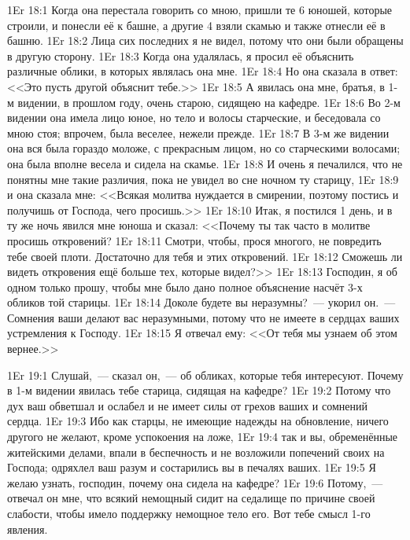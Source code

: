 \vs 1Er 18:1
Когда она перестала говорить со мною,
пришли те 6 юношей, которые строили,
и понесли её к башне,
а другие 4 взяли скамью и также отнесли её в башню.
\vs 1Er 18:2
Лица сих последних я не видел,
потому что они были обращены в другую сторону.
\vs 1Er 18:3
Когда она удалялась, я просил её объяснить различные облики,
в которых являлась она мне.
\vs 1Er 18:4
Но она сказала в ответ:
<<Это пусть другой объяснит тебе.>>
\vs 1Er 18:5
А явилась она мне, братья, в 1-м видении, в прошлом году,
очень старою, сидящею на кафедре.
\vs 1Er 18:6
Во 2-м видении она имела лицо юное,
но тело и волосы старческие, и беседовала со мною стоя;
впрочем, была веселее, нежели прежде.
\vs 1Er 18:7
В 3-м же видении она вся была гораздо моложе,
с прекрасным лицом, но со старческими волосами;
она была вполне весела и сидела на скамье.
\vs 1Er 18:8
И очень я печалился, что не понятны мне такие различия,
пока не увидел во сне ночном ту старицу,
\vs 1Er 18:9
и она сказала мне:
<<Всякая молитва нуждается в смирении,
поэтому постись и получишь от Господа, чего просишь.>>
\vs 1Er 18:10
Итак, я постился 1 день,
и в ту же ночь явился мне юноша и сказал:
<<Почему ты так часто в молитве просишь откровений?
\vs 1Er 18:11
Смотри, чтобы, прося многого, не повредить тебе своей плоти.
Достаточно для тебя и этих откровений.
\vs 1Er 18:12
Сможешь ли видеть откровения ещё больше тех, которые видел?>>
\vs 1Er 18:13
Господин, я об одном только прошу,
чтобы мне было дано полное объяснение насчёт 3-х обликов той старицы.
\vs 1Er 18:14
Доколе будете вы неразумны?~--- укорил он.~--- Сомнения ваши
делают вас неразумными, потому что не
имеете в сердцах ваших устремления к Господу.
\vs 1Er 18:15
Я отвечал ему:
<<От тебя мы узнаем об этом вернее.>>

\vs 1Er 19:1
Слушай,~--- сказал он,~--- об обликах, которые тебя интересуют.
Почему в 1-м видении явилась тебе старица, сидящая на кафедре?
\vs 1Er 19:2
Потому что дух ваш обветшал и ослабел
и не имеет силы от грехов ваших и сомнений сердца.
\vs 1Er 19:3
Ибо как старцы, не имеющие
надежды на обновление, ничего другого не желают,
кроме успокоения на ложе,
\vs 1Er 19:4
так и вы, обременённые житейскими делами,
впали в беспечность и не возложили попечений своих на
Господа; одряхлел ваш разум и состарились вы в печалях ваших.
\vs 1Er 19:5
Я желаю узнать, господин, почему она сидела на кафедре?
\vs 1Er 19:6
Потому,~--- отвечал он мне,
что всякий немощный сидит на седалище по причине своей слабости,
чтобы имело поддержку немощное тело его.
Вот тебе смысл 1-го явления.

